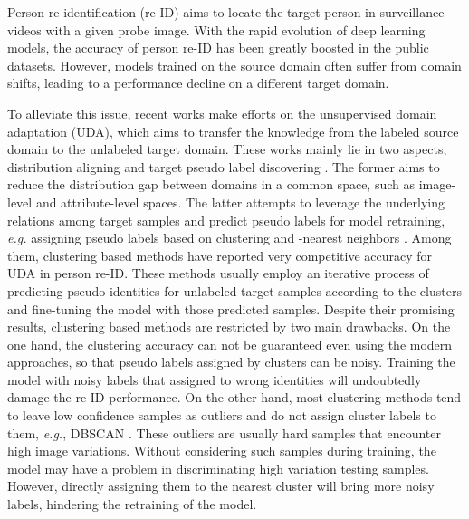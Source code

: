 \documentclass[letterpaper]{article} \usepackage{aaai20}  \usepackage{times}  \usepackage{helvet} \usepackage{courier}  \usepackage[hyphens]{url}  \usepackage{graphicx} \urlstyle{rm} \def\UrlFont{\rm}  \usepackage{graphicx}  \frenchspacing  \setlength{\pdfpagewidth}{8.5in}  \setlength{\pdfpageheight}{11in}  \usepackage{color}
\begin{document}
Person re-identification (re-ID) \cite{sun2018beyond,zheng2016person,li2018harmonious} aims to locate the target person in surveillance videos with a given probe image. With the rapid evolution of deep learning models, the accuracy of person re-ID has been greatly boosted in the public datasets. However, models trained on the source domain often suffer from domain shifts, leading to a performance decline on a different target domain.


To alleviate this issue, recent works \cite{zhong2019learning,zhong2018camstyle} make efforts on the unsupervised domain adaptation (UDA), which aims to transfer the knowledge from the labeled source domain to the unlabeled target domain. These works mainly lie in two aspects, distribution aligning \cite{PTGAN,SPGAN,chang2019disjoint,MMFA,TJAIDL} and target pseudo label discovering \cite{fan2017unsupervised,song2018unsupervised,li2018unsupervised}. The former aims to reduce the distribution gap between domains in a common space, such as image-level \cite{PTGAN,SPGAN} and attribute-level \cite{chang2019disjoint,MMFA,TJAIDL} spaces. The latter attempts to leverage the underlying relations among target samples and predict pseudo labels for model retraining, \textit{e.g.} assigning pseudo labels based on clustering \cite{fan2017unsupervised,song2018unsupervised,li2018unsupervised} and -nearest neighbors \cite{zhong2019invariance,yang2018leveraging}. Among them, clustering based methods have reported very competitive accuracy for UDA in person re-ID. These methods usually employ an iterative process of predicting pseudo identities for unlabeled target samples according to the clusters and fine-tuning the model with those predicted samples. Despite their promising results, clustering based methods are restricted by two main drawbacks. On the one hand, the clustering accuracy can not be guaranteed even using the modern approaches, so that pseudo labels assigned by clusters can be noisy. Training the model with noisy labels that assigned to wrong identities will undoubtedly damage the re-ID performance. On the other hand, most clustering methods tend to leave low confidence samples as outliers and do not assign cluster labels to them, \textit{e.g.}, DBSCAN \cite{ester1996density}. These outliers are usually hard samples that encounter high image variations. Without considering such samples during training, the model may have a problem in discriminating high variation testing samples. However, directly assigning them to the nearest cluster will bring more noisy labels, hindering the retraining of the model. 
\end{document}
